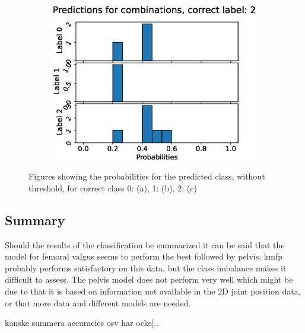 \begin{figure}
\begin{subfigure}[t]{0.33\textwidth}
    \includegraphics[width=\textwidth]{files/figs/res/kmfp/pc2.eps}
    \caption{}
    \label{fig:kmfp-pc2}
  \end{subfigure}

  \caption{Figures showing the probabilities for the predicted class, without threshold, for correct class 0: (a), 1: (b), 2: (c)}
  \label{fig:kmfp-pc}
\end{figure}

\subsection{Summary}
Should the results of the classification be summarized it can be said that the model for femoral valgus seems to perform the best followed by pelvis. \gls{kmfp} probably performs satisfactory on this data, but the class imbalance makes it difficult to assess. The pelvis model does not perform very well which might be due to that it is based on information not available in the 2D joint position data, or that more data and different models are needed.

kanske summera accuracies osv har ocks[..

